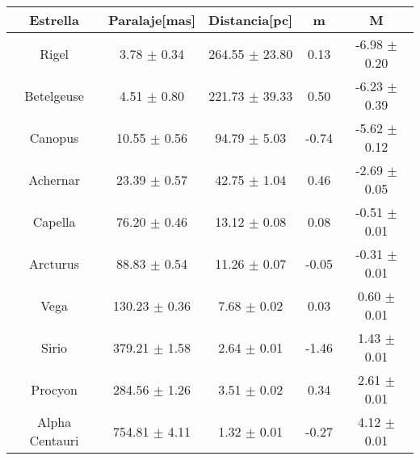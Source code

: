 \documentclass[12pt]{article}
\begin{document}
\begin{table}[h]
\centering
	\begin{tabular}{|c|c|c|c|c|}
	\hline
Estrella & Paralaje[mas] & Distancia[pc] & m & M \\ \hline
Rigel & 3.78 $\pm$ 0.34 & 264.55 $\pm$ 23.80 & 0.13 & -6.98 $\pm$ 0.20 \\ \hline
Betelgeuse & 4.51 $\pm$ 0.80 & 221.73 $\pm$ 39.33 & 0.50 & -6.23 $\pm$ 0.39 \\ \hline
Canopus & 10.55 $\pm$ 0.56 & 94.79 $\pm$ 5.03 & -0.74 & -5.62 $\pm$ 0.12 \\ \hline
Achernar & 23.39 $\pm$ 0.57 & 42.75 $\pm$ 1.04 & 0.46 & -2.69 $\pm$ 0.05 \\ \hline
Capella & 76.20 $\pm$ 0.46 & 13.12 $\pm$ 0.08 & 0.08 & -0.51 $\pm$ 0.01 \\ \hline
Arcturus & 88.83 $\pm$ 0.54 & 11.26 $\pm$ 0.07 & -0.05 & -0.31 $\pm$ 0.01 \\ \hline
Vega & 130.23 $\pm$ 0.36 & 7.68 $\pm$ 0.02 & 0.03 & 0.60 $\pm$ 0.01 \\ \hline
Sirio & 379.21 $\pm$ 1.58 & 2.64 $\pm$ 0.01 & -1.46 & 1.43 $\pm$ 0.01 \\ \hline
Procyon & 284.56 $\pm$ 1.26 & 3.51 $\pm$ 0.02 & 0.34 & 2.61 $\pm$ 0.01 \\ \hline
Alpha Centauri & 754.81 $\pm$ 4.11 & 1.32 $\pm$ 0.01 & -0.27 & 4.12 $\pm$ 0.01 \\ \hline
	\end{tabular}
\end{table}
\vspace{1mm}
\end{document}
